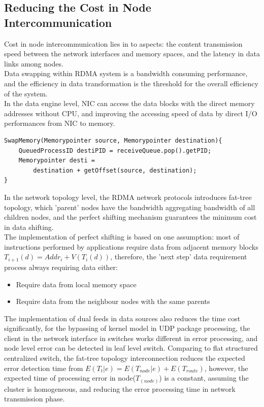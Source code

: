 \documentclass[11pt,openright,a4paper]{report}
\begin{document}
\subsection{Reducing the Cost in Node Intercommunication}
Cost in node intercommunication lies in to aspects: the content transmission speed between the network interfaces and memory spaces, and the latency in data links among nodes\cite{arimilli2010percs}.\\
Data swapping within RDMA system is a bandwidth consuming performance, and the efficiency in data transformation is the threshold for the overall efficiency of the system. \\
In the data engine level, NIC can access the data blocks with the direct memory addresses without CPU, and improving the accessing speed of data by direct I/O performances from NIC to memory. 
\begin{lstlisting}[breaklines,breakatwhitespace,caption={Direct Data access from NIC to memory},label=nic-psudoCode]
SwapMemory(Memorypointer source, Memorypointer destination){
	QueuedProcessID destiPID = receiveQueue.pop().getPID;
	Memorypointer desti = 
		destination + getOffset(source, destination);
}
\end{lstlisting}
In the network topology level, the RDMA network protocols introduces fat-tree topology, which 'parent' nodes have the bandwidth aggregating bandwidth of all children nodes, and the perfect shifting mechanism guarantees the minimum cost in data shifting.\\
The implementation of perfect shifting is based on one assumption: most of instructions performed by applications require data from adjacent memory blocks $T_{i+1}(d)=Addr_{i}+V(T_{i}(d))$, therefore, the 'next step' data requirement process always requiring data either:
\begin{itemize}
	\item Require data from local memory space
    \item Require data from the neighbour nodes with the same parents
\end{itemize}
The implementation of dual feeds in data sources also reduces the time cost significantly, for the bypassing of kernel model in UDP package processing, the client in the network interface in switches works different in error processing, and node level error can be detected in leaf level switch\cite{gu2009low}. Comparing to flat structured centralized switch, the fat-tree topology interconnection reduces the expected error detection time from $E(T_{t}|e)=E(T_{node}|e)+E(T_{route})$, however, the expected time of processing error in node($T_(node)$) is a constant, assuming the cluster is homogeneous, and reducing the error processing time in network transmission phase.\\
\end{document}
